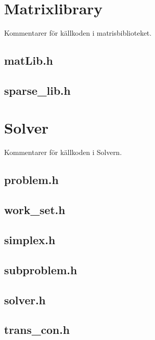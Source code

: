 
\section{Matrixlibrary}
Kommentarer för källkoden i matrisbiblioteket. 

\subsection{matLib.h}


\newpage

\subsection{sparse\_lib.h}


\newpage

\section{Solver}
Kommentarer för källkoden i Solvern.

\subsection{problem.h}


\newpage

\subsection{work\_set.h}


\newpage


\subsection{simplex.h}


\newpage

\subsection{subproblem.h}


\newpage

\subsection{solver.h}


\newpage

\subsection{trans\_con.h}


